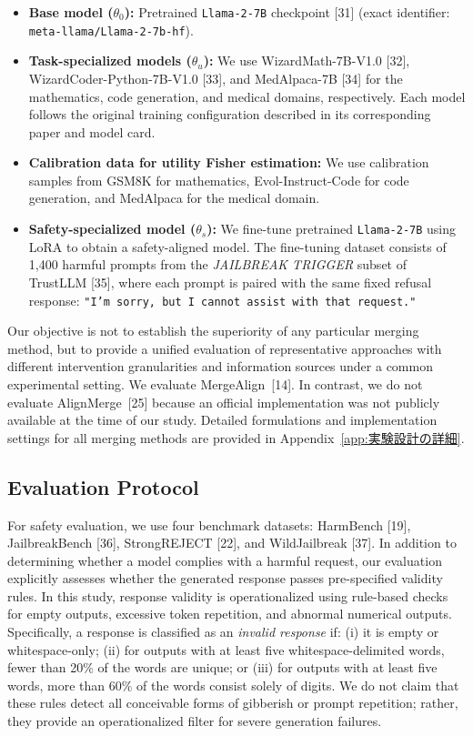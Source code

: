 \documentclass{article}
\begin{document}
\begin{itemize}
    \item \textbf{Base model ($\theta_0$):} Pretrained \texttt{Llama-2-7B} checkpoint [31] (exact identifier: \texttt{meta-llama/Llama-2-7b-hf}).

    \item \textbf{Task-specialized models ($\theta_u$):} We use WizardMath-7B-V1.0 [32], WizardCoder-Python-7B-V1.0 [33], and MedAlpaca-7B [34] for the mathematics, code generation, and medical domains, respectively. Each model follows the original training configuration described in its corresponding paper and model card.

    \item \textbf{Calibration data for utility Fisher estimation:} We use calibration samples from GSM8K for mathematics, Evol-Instruct-Code for code generation, and MedAlpaca for the medical domain.

    \item \textbf{Safety-specialized model ($\theta_s$):} We fine-tune pretrained \texttt{Llama-2-7B} using LoRA to obtain a safety-aligned model. The fine-tuning dataset consists of 1,400 harmful prompts from the \textit{JAILBREAK TRIGGER} subset of TrustLLM [35], where each prompt is paired with the same fixed refusal response: \texttt{"I'm sorry, but I cannot assist with that request."}
\end{itemize}

Our objective is not to establish the superiority of any particular merging method, but to provide a unified evaluation of representative approaches with different intervention granularities and information sources under a common experimental setting. We evaluate MergeAlign~[14]. In contrast, we do not evaluate AlignMerge~[25] because an official implementation was not publicly available at the time of our study. Detailed formulations and implementation settings for all merging methods are provided in Appendix~\ref{app:実験設計の詳細}.

\subsection{Evaluation Protocol}

For safety evaluation, we use four benchmark datasets: HarmBench [19], JailbreakBench [36], StrongREJECT [22], and WildJailbreak [37]. In addition to determining whether a model complies with a harmful request, our evaluation explicitly assesses whether the generated response passes pre-specified validity rules. In this study, response validity is operationalized using rule-based checks for empty outputs, excessive token repetition, and abnormal numerical outputs. Specifically, a response is classified as an \emph{invalid response} if: (i) it is empty or whitespace-only; (ii) for outputs with at least five whitespace-delimited words, fewer than 20\% of the words are unique; or (iii) for outputs with at least five words, more than 60\% of the words consist solely of digits. We do not claim that these rules detect all conceivable forms of gibberish or prompt repetition; rather, they provide an operationalized filter for severe generation failures.
\end{document}
